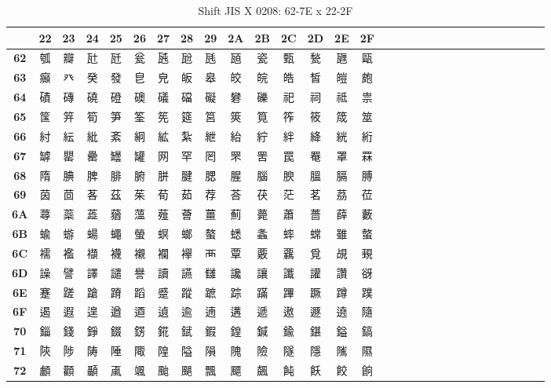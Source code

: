 \begin{table}[H]
\Fontified
\centering
\caption{Shift JIS X 0208: 62-7E x 22-2F}
\begin{tabular}{|Sc|Sc|Sc|Sc|Sc|Sc|Sc|Sc|Sc|Sc|Sc|Sc|Sc|Sc|Sc|}
\hline
 & \textbf{22} & \textbf{23} & \textbf{24} & \textbf{25} & \textbf{26} & \textbf{27} & \textbf{28} & \textbf{29} & \textbf{2A} & \textbf{2B} & \textbf{2C} & \textbf{2D} & \textbf{2E} & \textbf{2F} \\ \hline
\textbf{62} & 瓠 & 瓣 & 瓧 & 瓩 & 瓮 & 瓲 & 瓰 & 瓱 & 瓸 & 瓷 & 甄 & 甃 & 甅 & 甌 \\ \hline
\textbf{63} & 癲 & 癶 & 癸 & 發 & 皀 & 皃 & 皈 & 皋 & 皎 & 皖 & 皓 & 皙 & 皚 & 皰 \\ \hline
\textbf{64} & 磧 & 磚 & 磽 & 磴 & 礇 & 礒 & 礑 & 礙 & 礬 & 礫 & 祀 & 祠 & 祗 & 祟 \\ \hline
\textbf{65} & 筺 & 笄 & 筍 & 笋 & 筌 & 筅 & 筵 & 筥 & 筴 & 筧 & 筰 & 筱 & 筬 & 筮 \\ \hline
\textbf{66} & 紂 & 紜 & 紕 & 紊 & 絅 & 絋 & 紮 & 紲 & 紿 & 紵 & 絆 & 絳 & 絖 & 絎 \\ \hline
\textbf{67} & 罅 & 罌 & 罍 & 罎 & 罐 & 网 & 罕 & 罔 & 罘 & 罟 & 罠 & 罨 & 罩 & 罧 \\ \hline
\textbf{68} & 隋 & 腆 & 脾 & 腓 & 腑 & 胼 & 腱 & 腮 & 腥 & 腦 & 腴 & 膃 & 膈 & 膊 \\ \hline
\textbf{69} & 茵 & 茴 & 茖 & 茲 & 茱 & 荀 & 茹 & 荐 & 荅 & 茯 & 茫 & 茗 & 茘 & 莅 \\ \hline
\textbf{6A} & 蕁 & 蘂 & 蕋 & 蕕 & 薀 & 薤 & 薈 & 薑 & 薊 & 薨 & 蕭 & 薔 & 薛 & 藪 \\ \hline
\textbf{6B} & 蝓 & 蝣 & 蝪 & 蠅 & 螢 & 螟 & 螂 & 螯 & 蟋 & 螽 & 蟀 & 蟐 & 雖 & 螫 \\ \hline
\textbf{6C} & 襦 & 襤 & 襭 & 襪 & 襯 & 襴 & 襷 & 襾 & 覃 & 覈 & 覊 & 覓 & 覘 & 覡 \\ \hline
\textbf{6D} & 譟 & 譬 & 譯 & 譴 & 譽 & 讀 & 讌 & 讎 & 讒 & 讓 & 讖 & 讙 & 讚 & 谺 \\ \hline
\textbf{6E} & 蹇 & 蹉 & 蹌 & 蹐 & 蹈 & 蹙 & 蹤 & 蹠 & 踪 & 蹣 & 蹕 & 蹶 & 蹲 & 蹼 \\ \hline
\textbf{6F} & 遏 & 遐 & 遑 & 遒 & 逎 & 遉 & 逾 & 遖 & 遘 & 遞 & 遨 & 遯 & 遶 & 隨 \\ \hline
\textbf{70} & 錙 & 錢 & 錚 & 錣 & 錺 & 錵 & 錻 & 鍜 & 鍠 & 鍼 & 鍮 & 鍖 & 鎰 & 鎬 \\ \hline
\textbf{71} & 陝 & 陟 & 陦 & 陲 & 陬 & 隍 & 隘 & 隕 & 隗 & 險 & 隧 & 隱 & 隲 & 隰 \\ \hline
\textbf{72} & 顱 & 顴 & 顳 & 颪 & 颯 & 颱 & 颶 & 飄 & 飃 & 飆 & 飩 & 飫 & 餃 & 餉 \\ \hline

\end{tabular}
\end{table}
